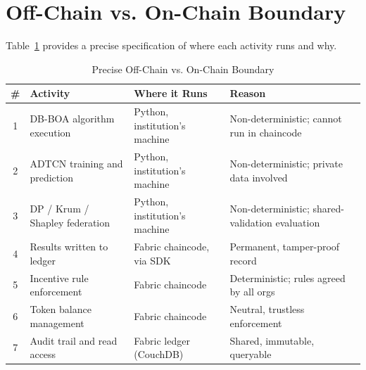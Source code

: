 \section{Off-Chain vs. On-Chain Boundary}

Table~\ref{tab:boundary} provides a precise specification of where each activity runs and why.

\begin{table}[htbp]
\centering
\caption{Precise Off-Chain vs. On-Chain Boundary}
\label{tab:boundary}
\begin{tabular}{|c|p{3.9cm}|p{3.7cm}|p{4.6cm}|}
\hline
\textbf{\#} & \textbf{Activity} & \textbf{Where it Runs} & \textbf{Reason} \\
\hline
1 & DB-BOA algorithm execution & Python, institution's machine & Non-deterministic; cannot run in chaincode \\
\hline
2 & ADTCN training and prediction & Python, institution's machine & Non-deterministic; private data involved \\
\hline
3 & DP / Krum / Shapley federation & Python, institution's machine & Non-deterministic; shared-validation evaluation \\
\hline
4 & Results written to ledger & Fabric chaincode, via SDK & Permanent, tamper-proof record \\
\hline
5 & Incentive rule enforcement & Fabric chaincode & Deterministic; rules agreed by all orgs \\
\hline
6 & Token balance management & Fabric chaincode & Neutral, trustless enforcement \\
\hline
7 & Audit trail and read access & Fabric ledger (CouchDB) & Shared, immutable, queryable \\
\hline
\end{tabular}
\end{table}
